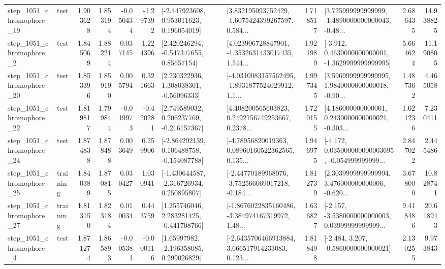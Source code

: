 \begin{tabular}{llrrrrllrlrr}
 step\_1051\_chromophore\_19 &      test &      1.903628 &    1.853194 &     -0.050434 & -1.297392 &    [-2.447923608, 0.953011623, 0.196054019] &  [3.832195093752429, -1.6075424399267597, 0.584... &       1.718517 &  [3.725999999999999, -1.4890000000000043, -0.48... &            2.686435 &         14.938825 \\
  step\_1051\_chromophore\_2 &      test &      1.845069 &    1.882214 &      0.037145 &  1.224396 &     [2.420246294, -0.547347655, 0.85657154] &  [4.023906728847901, -1.3532631433017435, 1.544... &       1.921989 &  [-3.912, 0.4630000000000001, -1.3629999999999995] &            5.664624 &         11.190805 \\
 step\_1051\_chromophore\_20 &      test &      1.853396 &    1.859190 &      0.005794 &  0.321663 &     [2.230322936, 1.308038301, -0.56096333] &  [-4.0310083157562495, -1.8931877524029912, 1.1... &       1.997345 &  [3.5969999999999995, 1.9840000000000018, -0.90... &            1.487362 &          4.465058 \\
 step\_1051\_chromophore\_22 &      test &      1.819817 &    1.799844 &     -0.019973 & -0.420281 &    [2.749589032, 0.206237769, -0.216157367] &  [4.408200565603823, 0.2492156749253667, 0.2378... &       1.720155 &  [4.186000000000001, 0.2430000000000021, -0.303... &            1.021236 &          7.230411 \\
 step\_1051\_chromophore\_24 &      test &      1.874838 &    1.878488 &      0.003649 &  0.259906 &   [-2.864292139, 0.106488758, -0.154087788] &  [-4.78956820019363, 0.08960160522362565, 0.135... &       1.946975 &  [-4.172, 0.035000000000003695, -0.054999999999... &            2.847022 &          2.445486 \\
 step\_1051\_chromophore\_25 &  training &      1.840389 &    1.870815 &      0.030427 &  1.030941 &   [-1.430644587, -2.316726934, 0.250895807] &  [-2.44770189968076, -3.752566069017218, -0.184... &       1.812739 &  [2.3039999999999994, 3.476000000000006, -0.620... &            3.678000 &         10.828741 \\
 step\_1051\_chromophore\_27 &  training &      1.813150 &    1.823184 &      0.010034 &  0.443759 &    [1.255746046, 2.283281425, -0.441708766] &  [-1.8676022835160486, -3.384974167319972, 1.48... &       1.636827 &  [-2.157, -3.5380000000000003, 0.03999999999999... &            9.418486 &         20.618943 \\
  step\_1051\_chromophore\_4 &      test &      1.871274 &    1.865893 &     -0.005381 & -0.000116 &     [1.65997982, -2.196358085, 0.299026829] &  [-2.6435706466913884, 3.666517914233083, 0.123... &       1.818498 &               [-2.484, 3.207, -0.5860000000000021] &            2.130255 &          9.973843 \\

\end{tabular}
